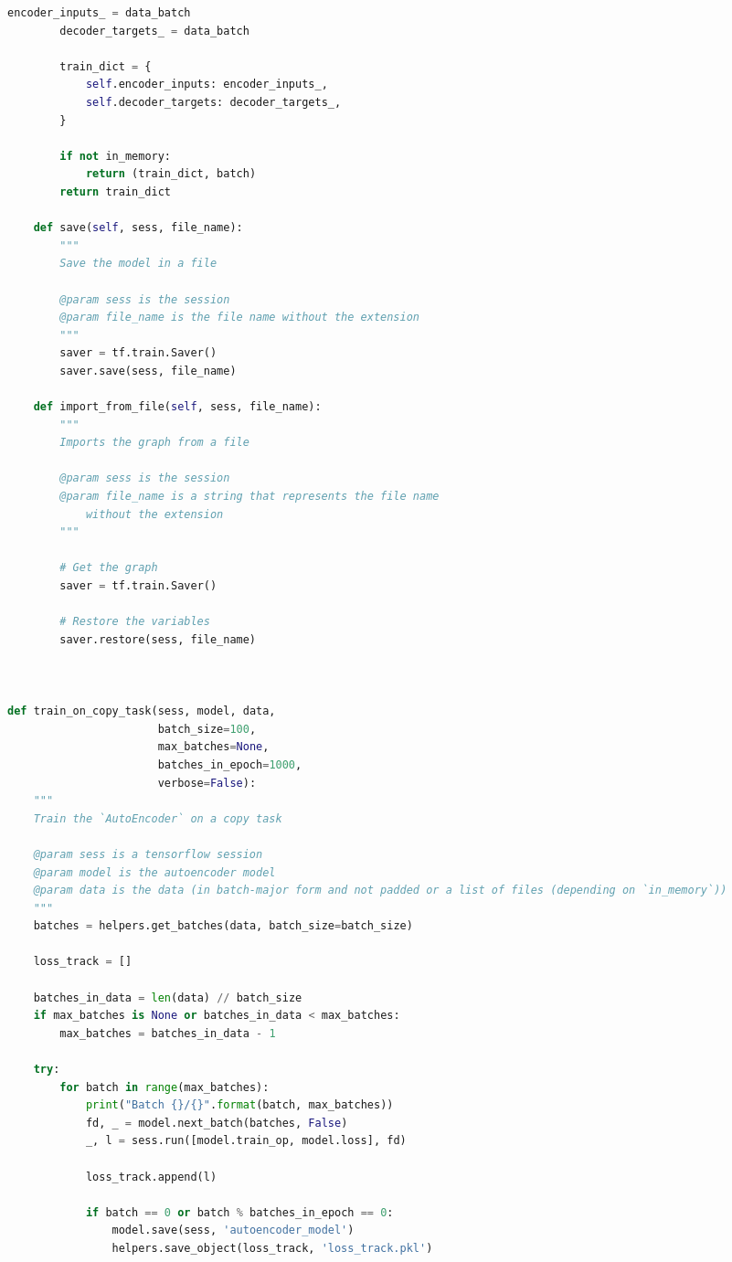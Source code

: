 \begin{landscape}
\begin{multicols}{2}
\begin{lstlisting}[language=Python]
        encoder_inputs_ = data_batch
        decoder_targets_ = data_batch

        train_dict = {
            self.encoder_inputs: encoder_inputs_,
            self.decoder_targets: decoder_targets_,
        }

        if not in_memory:
            return (train_dict, batch)
        return train_dict

    def save(self, sess, file_name):
        """
        Save the model in a file

        @param sess is the session
        @param file_name is the file name without the extension
        """
        saver = tf.train.Saver()
        saver.save(sess, file_name)

    def import_from_file(self, sess, file_name):
        """
        Imports the graph from a file

        @param sess is the session
        @param file_name is a string that represents the file name
            without the extension
        """

        # Get the graph
        saver = tf.train.Saver()

        # Restore the variables
        saver.restore(sess, file_name)



def train_on_copy_task(sess, model, data,
                       batch_size=100,
                       max_batches=None,
                       batches_in_epoch=1000,
                       verbose=False):
    """
    Train the `AutoEncoder` on a copy task

    @param sess is a tensorflow session
    @param model is the autoencoder model
    @param data is the data (in batch-major form and not padded or a list of files (depending on `in_memory`))
    """
    batches = helpers.get_batches(data, batch_size=batch_size)

    loss_track = []

    batches_in_data = len(data) // batch_size
    if max_batches is None or batches_in_data < max_batches:
        max_batches = batches_in_data - 1

    try:
        for batch in range(max_batches):
            print("Batch {}/{}".format(batch, max_batches))
            fd, _ = model.next_batch(batches, False)
            _, l = sess.run([model.train_op, model.loss], fd)

            loss_track.append(l)

            if batch == 0 or batch % batches_in_epoch == 0:
                model.save(sess, 'autoencoder_model')
                helpers.save_object(loss_track, 'loss_track.pkl')


\end{lstlisting}
\end{multicols}
\end{landscape}
